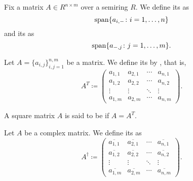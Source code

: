 \begin{definition}\label{def:matrix_column_and_row_space}
  Fix a matrix \( A \in R^{n \times m} \) over a semiring \( R \). We define its  as
  \begin{equation*}
    \operatorname{span} \{ a_{i,-} \colon i = 1, \ldots, n \}
  \end{equation*}
  and its  as
  \begin{equation*}
    \operatorname{span} \{ a_{-,j} \colon j = 1, \ldots, m \}.
  \end{equation*}
\end{definition}

\begin{definition}\label{def:matrix_transpose}
  Let \( A = \{ a_{i,j} \}_{i,j=1}^{n,m} \) be a matrix. We define its  by , that is,
  \begin{equation*}
    A^T \coloneqq \begin{pmatrix}
      a_{1,1} & a_{2,1} & \cdots & a_{n,1} \\
      a_{1,2} & a_{2,2} & \cdots & a_{n,2} \\
      \vdots  & \vdots  & \ddots & \vdots  \\
      a_{1,m} & a_{2,m} & \cdots & a_{n,m}
    \end{pmatrix}.
  \end{equation*}
\end{definition}

\begin{definition}\label{def:symmetric_matrix}
  A square matrix \( A \) is said to be  if \( A = A^T \).
\end{definition}

\begin{definition}\label{def:matrix_conjugate_transpose}
  Let \( A \) be a complex matrix. We define its  as
  \begin{equation*}
    A^\dagger \coloneqq \begin{pmatrix}
      \overline{a_{1,1}} & \overline{a_{2,1}} & \cdots & \overline{a_{n,1}} \\
      \overline{a_{1,2}} & \overline{a_{2,2}} & \cdots & \overline{a_{n,2}} \\
      \vdots       & \vdots       & \ddots & \vdots       \\
      \overline{a_{1,m}} & \overline{a_{2,m}} & \cdots & \overline{a_{n,m}}
    \end{pmatrix}.
  \end{equation*}
\end{definition}

